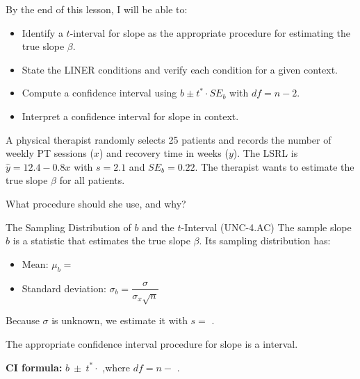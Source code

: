 \documentclass[10pt]{article}
\begin{document}
\namedateperiod

\begin{objectivebox}
By the end of this lesson, I will be able to:
\begin{itemize}
    \item[$\square$] Identify a $t$-interval for slope as the appropriate procedure for estimating the true slope $\beta$.
    \item[$\square$] State the LINER conditions and verify each condition for a given context.
    \item[$\square$] Compute a confidence interval using $b \pm t^* \cdot SE_b$ with $df = n - 2$.
    \item[$\square$] Interpret a confidence interval for slope in context.
\end{itemize}
\end{objectivebox}

\begin{vocabbox}
\end{vocabbox}

\begin{hookbox}
A physical therapist randomly selects 25 patients and records the number of weekly PT
sessions ($x$) and recovery time in weeks ($y$). The LSRL is $\hat{y} = 12.4 - 0.8x$
with $s = 2.1$ and $SE_b = 0.22$. The therapist wants to estimate the true slope $\beta$
for all patients.

What procedure should she use, and why? 
\end{hookbox}

\begin{notesbox}{The Sampling Distribution of $b$ and the $t$-Interval (UNC-4.AC)}
The sample slope $b$ is a statistic that estimates the true slope $\beta$.
Its sampling distribution has:
\begin{itemize}
    \item Mean: $\mu_b = $ \ans{$\beta$}
    \item Standard deviation: $\sigma_b = \dfrac{\sigma}{\sigma_x\sqrt{n}}$
\end{itemize}

\vspace{0.1in}
Because $\sigma$ is unknown, we estimate it with
$s = $ .

\vspace{0.15in}
The appropriate confidence interval procedure for slope is a  interval.

\vspace{0.1in}
\textbf{CI formula:}\quad
$b\ \pm\ t^* \cdot$ ,\quad where $df = n -$ .
\end{notesbox}
\end{document}
